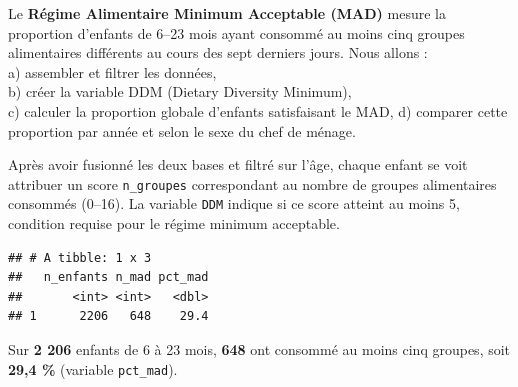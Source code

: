 \documentclass[
]{article}
\begin{document}
Le \textbf{Régime Alimentaire Minimum Acceptable (MAD)} mesure la
proportion d'enfants de 6--23 mois ayant consommé au moins cinq groupes
alimentaires différents au cours des sept derniers jours. Nous allons
:\\
a) assembler et filtrer les données,\\
b) créer la variable DDM (Dietary Diversity Minimum),\\
c) calculer la proportion globale d'enfants satisfaisant le MAD, d)
comparer cette proportion par année et selon le sexe du chef de ménage.

Après avoir fusionné les deux bases et filtré sur l'âge, chaque enfant
se voit attribuer un score \texttt{n\_groupes} correspondant au nombre
de groupes alimentaires consommés (0--16). La variable \texttt{DDM}
indique si ce score atteint au moins 5, condition requise pour le régime
minimum acceptable.

\begin{verbatim}
## # A tibble: 1 x 3
##   n_enfants n_mad pct_mad
##       <int> <int>   <dbl>
## 1      2206   648    29.4
\end{verbatim}

Sur \textbf{2 206} enfants de 6 à 23 mois, \textbf{648} ont consommé au
moins cinq groupes, soit \textbf{29,4 \%} (variable \texttt{pct\_mad}).
\end{document}
